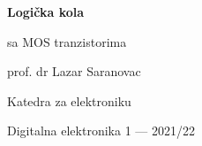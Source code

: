 \begin{frame}[label=09_1-s001]{}\setlength{\parskip}{2pt}\setlength{\abovedisplayskip}{4pt}\setlength{\belowdisplayskip}{4pt}\setlength{\abovedisplayshortskip}{3pt}\setlength{\belowdisplayshortskip}{3pt}
\centering
{\fontsize{25}{29}\selectfont\bfseries Logička kola\par sa MOS tranzistorima\par}
\vspace{7mm}{\Large 1. deo\par}
\vspace{8mm}prof. dr Lazar Saranovac\par Katedra za elektroniku\par Digitalna elektronika 1 — 2021/22
\end{frame}
